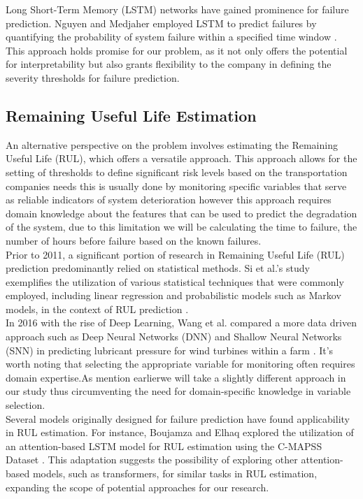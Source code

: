 \documentclass{article}
\begin{document}
Long Short-Term Memory (LSTM) networks have gained prominence for failure prediction. Nguyen and Medjaher employed LSTM to predict failures by quantifying the probability of system failure within a specified time window \cite{nguyen2019}. This approach holds promise for our problem, as it not only offers the potential for interpretability but also grants flexibility to the company in defining the severity thresholds for failure prediction.

\subsection{Remaining Useful Life Estimation}

An alternative perspective on the problem involves estimating the Remaining Useful Life (RUL), which offers a versatile approach. This approach allows for the setting of thresholds to define significant risk levels based on the transportation companies needs this is usually done by monitoring specific variables that serve as reliable indicators of system deterioration however this approach requires domain knowledge about the features that can be used to predict the degradation of the system, due to this limitation we will be calculating the time to failure, the number of hours before failure based on the known failures. \\

Prior to 2011, a significant portion of research in Remaining Useful Life (RUL) prediction predominantly relied on statistical methods. Si et al.'s study exemplifies the utilization of various statistical techniques that were commonly employed, including linear regression and probabilistic models such as Markov models, in the context of RUL prediction \cite{SI2011}. \\

In 2016 with the rise of Deep Learning, Wang et al. compared a more data driven approach such as Deep Neural Networks (DNN) and Shallow Neural Networks (SNN) in predicting lubricant pressure for wind turbines within a farm \cite{wang2016}. It's worth noting that selecting the appropriate variable for monitoring often requires domain expertise.As mention earlierwe will take a slightly different approach in our study thus circumventing the need for domain-specific knowledge in variable selection. \\

Several models originally designed for failure prediction have found applicability in RUL estimation. For instance, Boujamza and Elhaq explored the utilization of an attention-based LSTM model for RUL estimation using the C-MAPSS Dataset \cite{Boujamza2022}. This adaptation suggests the possibility of exploring other attention-based models, such as transformers, for similar tasks in RUL estimation, expanding the scope of potential approaches for our research.
\end{document}
